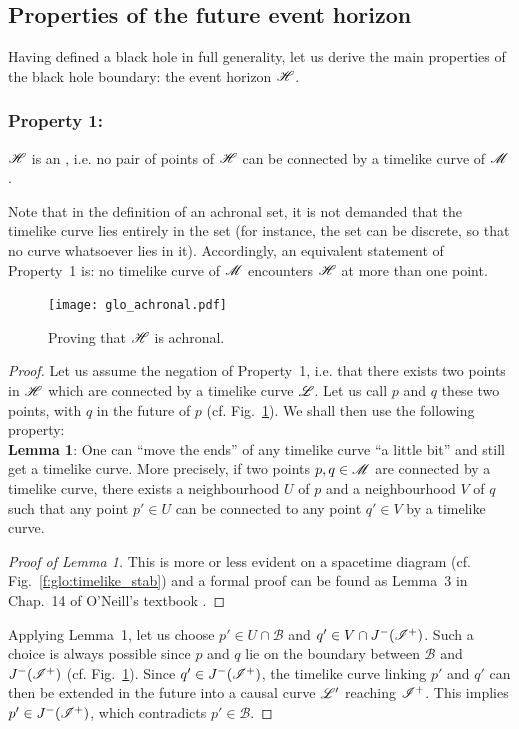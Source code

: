 \subsection{Properties of the future event horizon} \label{s:glo:properties_H}

Having defined a black hole in full generality, let us derive the
main properties of the black hole boundary: the event horizon $\mathscr{H}$.

\subsubsection{Property 1:}
\begin{greybox}
$\mathscr{H}$ is an , i.e. no pair of points of $\mathscr{H}$ can be connected
by a timelike curve of $\mathscr{M}$.
\end{greybox}

Note that in the definition of an achronal set, it is not demanded that the timelike
curve lies entirely in the set (for instance, the set can be discrete, so that no curve
whatsoever lies in it). Accordingly,
an equivalent statement of Property~1 is: no timelike curve of $\mathscr{M}$
encounters $\mathscr{H}$ at more than one point.

\begin{figure}
\centerline{\texttt{[image: glo\_achronal.pdf]}}
\caption[]{\label{f:glo:achronal} \footnotesize
Proving that $\mathscr{H}$ is achronal.}
\end{figure}

\begin{proof}
Let us assume the negation of Property~1, i.e. that there exists two points
in $\mathscr{H}$ which are connected by a timelike curve $\mathscr{L}$. Let us call $p$ and
$q$ these two points, with $q$ in the future of $p$ (cf. Fig.~\ref{f:glo:achronal}).
We shall then use the following property:\\[1ex]
\textbf{Lemma 1}: One can ``move the ends'' of any timelike curve
``a little bit'' and still get a timelike curve. More precisely,
if two points $p,q\in\mathscr{M}$ are connected by a timelike curve,
there exists
a neighbourhood $U$ of $p$ and a neighbourhood $V$ of $q$ such that
any point $p'\in U$ can be connected to any point $q'\in V$ by a timelike curve.
\begin{proof}[Proof of Lemma 1]
This is more or less evident on a spacetime diagram (cf. Fig.~\ref{f:glo:timelike_stab})
and a formal proof
can be found as Lemma~3
in Chap.~14 of O'Neill's textbook \cite{ONeil83}.
\end{proof}
Applying Lemma~1,
let us choose $p'\in U\cap\mathscr{B}$ and $q'\in V\cap J^-(\mathscr{I}^+)$. Such a choice is
always possible since $p$ and $q$ lie on the boundary between $\mathscr{B}$
and $J^-(\mathscr{I}^+)$ (cf. Fig.~\ref{f:glo:achronal}).
Since $q'\in J^-(\mathscr{I}^+)$, the timelike curve linking $p'$ and $q'$ can then be extended in the future into a causal curve $\mathscr{L}'$ reaching $\mathscr{I}^+$. This implies $p'\in J^-(\mathscr{I}^+)$,
which contradicts $p'\in\mathscr{B}$.
\end{proof}

